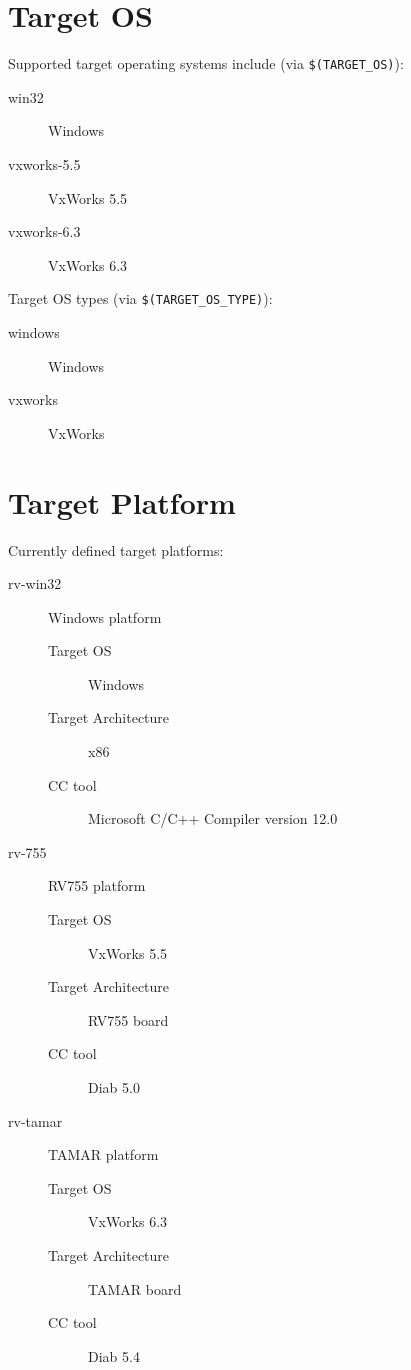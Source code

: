 \documentclass[a4paper]{article}
\begin{document}
\section{Target OS}
Supported target operating systems include (via \verb"$(TARGET_OS)"):
\begin{description}
  \item[win32] Windows
  \item[vxworks-5.5] VxWorks 5.5
  \item[vxworks-6.3] VxWorks 6.3
\end{description}
Target OS types (via \verb"$(TARGET_OS_TYPE)"):
\begin{description}
  \item[windows] Windows
  \item[vxworks] VxWorks
\end{description}

\section{Target Platform}
Currently defined target platforms:
\begin{description}
    \item[rv-win32]Windows platform
        \begin{description}
            \item[Target OS]Windows
            \item[Target Architecture]x86
            \item[CC tool] Microsoft C/C++ Compiler version 12.0
        \end{description}
    \item[rv-755]RV755 platform
        \begin{description}
            \item[Target OS] VxWorks 5.5
            \item[Target Architecture] RV755 board
            \item[CC tool] Diab 5.0
        \end{description}
    \item[rv-tamar]TAMAR platform
        \begin{description}
            \item[Target OS] VxWorks 6.3
            \item[Target Architecture] TAMAR board
            \item[CC tool] Diab 5.4
        \end{description}
\end{description}
\end{document}
